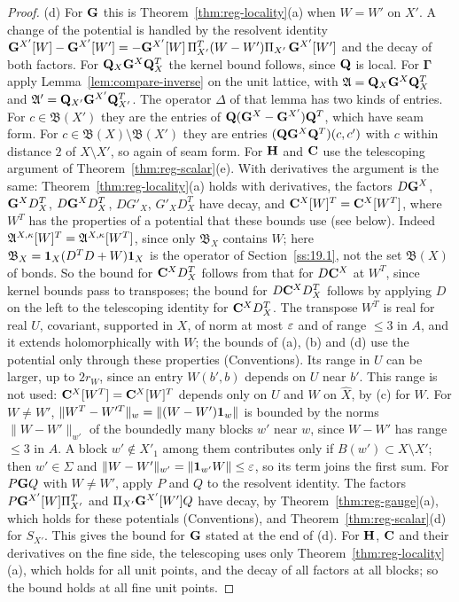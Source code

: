 \begin{proof}
(d) For $\mathbf G$ this is Theorem~\ref{thm:reg-locality}(a) when $W=W'$ on $X'$. A change of the potential is handled by the resolvent identity $\mathbf G^{X'}[W]-\mathbf G^{X'}[W']=-\mathbf G^{X'}[W]\,\Pi_{X'}^T(W-W')\Pi_{X'}\,\mathbf G^{X'}[W']$ and the decay of both factors. For $\mathbf Q_X\mathbf G^X\mathbf Q_X^T$ the kernel bound follows, since $\mathbf Q$ is local. For $\boldsymbol\Gamma$ apply Lemma~\ref{lem:compare-inverse} on the unit lattice, with $\mathfrak A=\mathbf Q_X\mathbf G^X\mathbf Q_X^T$ and $\mathfrak A'=\mathbf Q_{X'}\mathbf G^{X'}\mathbf Q_{X'}^T$. The operator $\Delta$ of that lemma has two kinds of entries. For $c\in\mathfrak B(X')$ they are the entries of $\mathbf Q(\mathbf G^X-\mathbf G^{X'})\mathbf Q^T$, which have seam form. For $c\in\mathfrak B(X)\setminus\mathfrak B(X')$ they are entries $(\mathbf Q\mathbf G^X\mathbf Q^T)(c,c')$ with $c$ within distance $2$ of $X\setminus X'$, so again of seam form. For $\mathbf H$ and $\mathbf C$ use the telescoping argument of Theorem~\ref{thm:reg-scalar}(e). With derivatives the argument is the same: Theorem~\ref{thm:reg-locality}(a) holds with derivatives, the factors $D\mathbf G^X$, $\mathbf G^XD^T_X$, $D\mathbf G^XD^T_X$, $DG'_X$, $G'_XD^T_X$ have decay, and $\mathbf C^X[W]^T=\mathbf C^X[W^T]$, where $W^T$ has the properties of a potential that these bounds use (see below). Indeed $\mathfrak A^{X,\kappa}[W]^T=\mathfrak A^{X,\kappa}[W^T]$, since only $\mathfrak B_X$ contains $W$; here $\mathfrak B_X=\mathbf 1_X(D^TD+W)\mathbf 1_X$ is the operator of Section~\ref{ss:19.1}, not the set $\mathfrak B(X)$ of bonds. So the bound for $\mathbf C^XD^T_X$ follows from that for $D\mathbf C^X$ at $W^T$, since kernel bounds pass to transposes; the bound for $D\mathbf C^XD^T_X$ follows by applying $D$ on the left to the telescoping identity for $\mathbf C^XD^T_X$. The transpose $W^T$ is real for real $U$, covariant, supported in $X$, of norm at most $\varepsilon$ and of range $\le3$ in $A$, and it extends holomorphically with $W$; the bounds of (a), (b) and (d) use the potential only through these properties (Conventions). Its range in $U$ can be larger, up to $2r_W$, since an entry $W(b',b)$ depends on $U$ near $b'$. This range is not used: $\mathbf C^X[W^T]=\mathbf C^X[W]^T$ depends only on $U$ and $W$ on $\hat X$, by (c) for $W$. For $W\ne W'$, $\|W^T-W'^T\|_w=\|(W-W')\mathbf 1_w\|$ is bounded by the norms $\|W-W'\|_{w'}$ of the boundedly many blocks $w'$ near $w$, since $W-W'$ has range $\le3$ in $A$. A block $w'\notin X'_1$ among them contributes only if $B(w')\subset X\setminus X'$; then $w'\in\Sigma$ and $\|W-W'\|_{w'}=\|\mathbf 1_{w'}W\|\le\varepsilon$, so its term joins the first sum. For $P\mathbf G Q$ with $W\ne W'$, apply $P$ and $Q$ to the resolvent identity. The factors $P\mathbf G^{X'}[W]\Pi_{X'}^T$ and $\Pi_{X'}\mathbf G^{X'}[W']Q$ have decay, by Theorem~\ref{thm:reg-gauge}(a), which holds for these potentials (Conventions), and Theorem~\ref{thm:reg-scalar}(d) for $S_{X'}$. This gives the bound for $\mathbf G$ stated at the end of (d). For $\mathbf H$, $\mathbf C$ and their derivatives on the fine side, the telescoping uses only Theorem~\ref{thm:reg-locality}(a), which holds for all unit points, and the decay of all factors at all blocks; so the bound holds at all fine unit points.


\end{proof}

